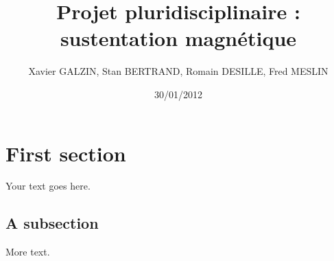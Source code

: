 \documentclass[11pt, french]{article} %
\title{Projet pluridisciplinaire : sustentation magnétique}
\author{ Xavier GALZIN, Stan BERTRAND, Romain DESILLE, Fred MESLIN}
\date{30/01/2012}
\begin{document}
\maketitle

\section{First section}

Your text goes here.



\subsection{A subsection}

More text.
\end{document}
